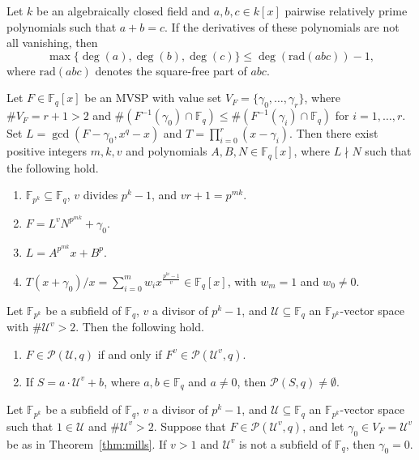 \documentclass[10pt,a4paper]{amsart}
\newcommand{\F}{\mathbb{F}}
\newcommand{\rad}{\mathrm{rad}}
\begin{document}
\begin{theorem}\label{abc} Let $k$ be an algebraically closed field and $a, b, c\in k[x]$ pairwise relatively prime polynomials such that $a+b=c$. If the derivatives of these polynomials are not all vanishing, then 
$$\max\{\deg(a), \deg(b), \deg(c)\}\le \deg(\rad(abc))-1,$$
where $\rad(abc)$ denotes the square-free part of $abc$.
\end{theorem}

\begin{theorem}[Mills]\label{thm:mills}
Let $F\in \F_q[x]$ be an MVSP with value set $V_{F}=\{\gamma_0, \ldots, \gamma_r\}$, where $\# V_F=r+1>2$ and $\# (F^{-1}(\gamma_0)\cap \F_q)\le \# (F^{-1}(\gamma_i)\cap \F_q)$ for  $i=1,\ldots, r$. Set $L=\gcd(F-\gamma_0,x^q-x)$  and $T=\prod\limits_{i=0}^{r}(x-\gamma_i)$. Then there exist positive integers $m, k, v$  and polynomials $A, B, N\in \F_q[x]$, where $L\nmid N$  such that the following hold.
\begin{enumerate}[\rm(i)]
\item $\F_{p^k} \subseteq \F_q$, $v$ divides $p^{k}-1$, and $vr+1=p^{mk}$.
\item $F=L^vN^{p^{mk}}+\gamma_0$.
\item $L=A^{p^{mk}}x+B^p$.
\item $T(x+\gamma_0)/x=\sum\limits_{i=0}^{m}w_ix^{\frac{p^{ki}-1}{v}}  \in \F_q[x]$,  with $w_m=1$ and $w_0\ne 0$.
\end{enumerate}
\end{theorem}

\begin{lemma}\label{lem:aux}
Let $\F_{p^k}$ be a subfield of $ \F_q$, $v$ a divisor of $p^k-1$, and $\mathcal U\subseteq \F_q$ an $\F_{p^k}$-vector space with $\#\mathcal U^v>2$. Then the following hold.
\begin{enumerate}[\rm(i)]
\item $F\in\mathcal P(\mathcal U, q)$ if and only if $F^v\in\mathcal P(\mathcal U^v, q)$.
\item If $S=a\cdot\mathcal U^{v}+b$, where $a, b\in \F_q$ and $a\neq 0$, then $\mathcal P(S, q) \neq \emptyset$.
\end{enumerate}
\end{lemma}

 \begin{lemma}\label{lem:gamma}
Let $\F_{p^k}$ be a subfield of $ \F_q$, $v$ a divisor of $p^k-1$, and $\mathcal U\subseteq \F_q$  an $\F_{p^k}$-vector space such that $1\in \mathcal U$ and $\#\mathcal U^v>2$. Suppose that $F\in \mathcal P(\mathcal U^v, q)$, and let $\gamma_0 \in V_F=\mathcal U^v$ be as in Theorem~\ref{thm:mills}. If $v>1$ and $\mathcal U^v$ is not a subfield of $\F_q$, then $\gamma_0=0$.
\end{lemma}
\end{document}

